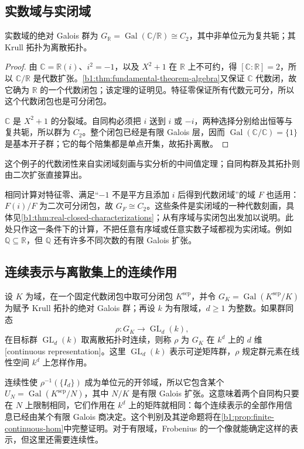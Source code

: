 \subsection{实数域与实闭域}
\label{b1:subsec:2204:02}
\begin{proposition}\label{b1:prop:real-absolute-galois}
	实数域的绝对 Galois 群为 \(G_{\mathbb R}=\operatorname{Gal}(\mathbb C/\mathbb R)\cong C_2\)，其中非单位元为复共轭；其 Krull 拓扑为离散拓扑。
\end{proposition}
\begin{proof}
	由 \(\mathbb C=\mathbb R(i)\)、\(i^2=-1\)，以及 \(X^2+1\) 在 \(\mathbb R\) 上不可约，得 \([\mathbb C:\mathbb R]=2\)，所以 \(\mathbb C/\mathbb R\) 是代数扩张。\cref{b1:thm:fundamental-theorem-algebra}又保证 \(\mathbb C\) 代数闭，故它确为 \(\mathbb R\) 的一个代数闭包；该定理的证明见。特征零保证所有代数元可分，所以这个代数闭包也是可分闭包。

	\(\mathbb C\) 是 \(X^2+1\) 的分裂域。自同构必须把 \(i\) 送到 \(i\) 或 \(-i\)，两种选择分别给出恒等与复共轭，所以群为 \(C_2\)。整个闭包已经是有限 Galois 层，因而 \(\operatorname{Gal}(\mathbb C/\mathbb C)=\{1\}\) 是基本开子群；它的每个陪集都是单点开集，故拓扑离散。
\end{proof}
这个例子的代数闭性来自实闭域刻画与实分析的中间值定理；自同构群及其拓扑则由二次扩张直接算出。

\ProseParagraphBreak
相同计算对特征零、满足“\(-1\) 不是平方且添加 \(i\) 后得到代数闭域”的域 \(F\) 也适用：\(F(i)/F\) 为二次可分闭包，故 \(G_F\cong C_2\)。这些条件是实闭域的一种代数刻画，具体见\cref{b1:thm:real-closed-characterizations}；从有序域与实闭包出发加以说明。此处只作这一条件下的计算，不把任意有序域或任意实数子域都视为实闭域。例如 \(\mathbb Q\subseteq\mathbb R\)，但 \(\mathbb Q\) 还有许多不同次数的有限 Galois 扩张。

\subsection{连续表示与离散集上的连续作用}
\label{b1:subsec:2204:03}
\begin{definition}\label{b1:def:continuous-finite-representation}
	设 \(K\) 为域，在一个固定代数闭包中取可分闭包 \(K^{\mathrm{sep}}\)，并令 \(G_K=\operatorname{Gal}(K^{\mathrm{sep}}/K)\) 为赋予 Krull 拓扑的绝对 Galois 群；再设 \(k\) 为有限域，\(d\geq1\) 为整数。如果群同态
	\[
		\rho:G_K\longrightarrow\operatorname{GL}_d(k),
	\]
	在目标群 \(\operatorname{GL}_d(k)\) 取离散拓扑时连续，则称 \(\rho\) 为 \(G_K\) 在 \(k^d\) 上的 \(d\) 维[continuous representation]。这里 \(\operatorname{GL}_d(k)\) 表示可逆矩阵群，\(\rho\) 规定群元素在线性空间 \(k^d\) 上怎样作用。
\end{definition}
连续性使 \(\rho^{-1}(\{I_d\})\) 成为单位元的开邻域，所以它包含某个 \(U_N=\operatorname{Gal}(K^{\mathrm{sep}}/N)\)，其中 \(N/K\) 是有限 Galois 扩张。这意味着两个自同构只要在 \(N\) 上限制相同，它们作用在 \(k^d\) 上的矩阵就相同：每个连续表示的全部作用信息已经由某个有限 Galois 商决定。这个判别及其逆命题将在\cref{b1:prop:finite-continuous-hom}中完整证明。对于有限域，Frobenius 的一个像就能确定这样的表示，但这里还需要连续性。

